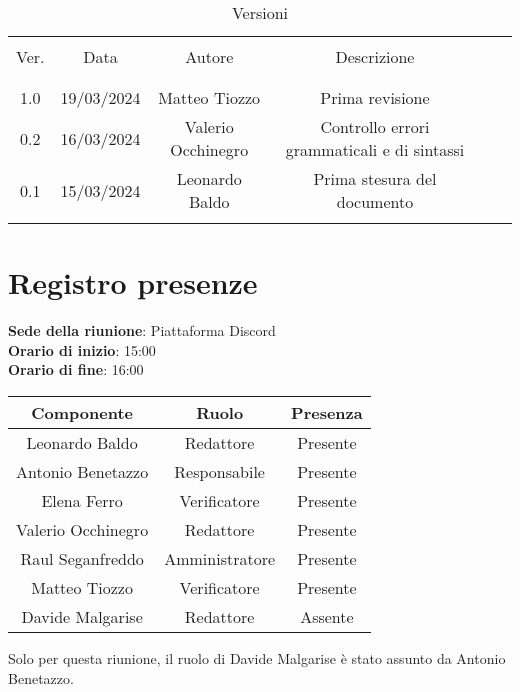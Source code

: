 \documentclass[italian,12pt]{article} %
\begin{document}


\newpage





\begin{table}[!h]
	\caption{Versioni}
	\begin{center}
		\begin{tabular}{ c c c c c c }
			\hline \\[-2ex]
			Ver. & Data & Autore & Descrizione \\
			\\[-2ex] \hline \\[-1.5ex]
			1.0 & 19/03/2024 & Matteo Tiozzo & Prima revisione \\
			0.2 & 16/03/2024 & Valerio Occhinegro& Controllo errori grammaticali e di sintassi  \\
			0.1 & 15/03/2024 & Leonardo Baldo& Prima stesura del documento \\
			\\[-1.5ex] \hline
		\end{tabular}
	\end{center}
\end{table}
\newpage

\tableofcontents

\newpage

\section{Registro presenze}


\textbf{Sede della riunione}: Piattaforma Discord\\
\textbf{Orario di inizio}: 15:00\\
\textbf{Orario di fine}: 16:00\\

\begin{flushleft}
\begin{table}[!h]
\begin{tabular}{ |c|c|c| } 
	\hline
	\textbf{Componente} & \textbf{Ruolo} & \textbf{Presenza} \\
	\hline 
	Leonardo Baldo 		& Redattore & Presente \\ 
	Antonio Benetazzo 	& Responsabile & Presente \\
	Elena Ferro 		& Verificatore & Presente \\
	Valerio Occhinegro 	& Redattore & Presente \\
	Raul Seganfreddo 	& Amministratore & Presente \\
	Matteo Tiozzo 		& Verificatore & Presente \\ 
	Davide Malgarise 	& Redattore & Assente \\
	\hline
\end{tabular}
\end{table}
Solo per questa riunione, il ruolo di Davide Malgarise è stato assunto da Antonio Benetazzo.
\end{flushleft}
\end{document}
